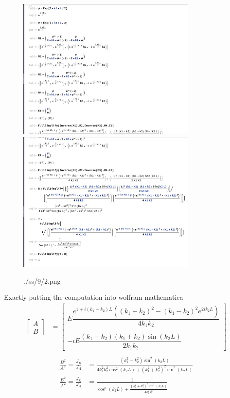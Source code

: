 \documentclass[letter, 10pts]{article}
\begin{document}
\begin{figure}[H]
	\centering
	\includegraphics[width=0.8\textwidth]{./ss/9/1.png}
	\includegraphics[width=0.8\textwidth]{./ss/9/2.png}
	\caption{./ss/9/2.png}
	\label{fig:-ss-9-2-png}
\end{figure}


Exactly putting the computation into wolfram mathematica
\begin{align*}
	\begin{bmatrix} A\\B \end{bmatrix} 
	&= 
	\begin{bmatrix} 
E
\dfrac{
e^{1+ i (k_1 - k_2) L } 
\left(
	(k_1 + k_2)^2 - (k_1 - k_2)^2 e^{2 i k_2 L}
\right)
}{4 k_1 k_2}
\\ \ \\ 	-i E 
	\dfrac{(k_1 - k_2) (k_1 + k_2) \sin (k_2 L)}{2k_1 k_2}
	\end{bmatrix} \\
\end{align*}
\begin{align*}
	\frac{B^2}{A^2} = \frac{J_B}{J_A} &= 
\frac{
	(k_1^2 - k_2^2) \sin ^2(k_2 L) 
}{4 k_1 ^2 k_2 ^2 
\cos ^2 (k_2 L) + 
(k_1 ^2 + k_2 ^2)^2 \sin ^2(k_2 L)}
	\\
	\frac{E^2}{A^2} 
	=  
	\frac{J_E}{J_A} &= 
\frac{1}{
\cos ^2 (k_2 L) 
+ 
\frac{
	(k_1 ^2 + k_2^2)^2 \sin ^2 (k_2 L)
}{4 k_1 ^2 k_2 ^2}
}
	\\
\end{align*}
\end{document}
